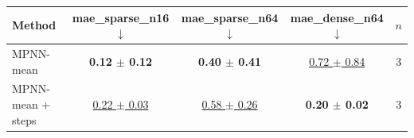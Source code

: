 \begin{tabular}{lcccc}
\toprule
Method & mae\_sparse\_n16 $\downarrow$ & mae\_sparse\_n64 $\downarrow$ & mae\_dense\_n64 $\downarrow$ & $n$ \\
\midrule
MPNN-mean & \textbf{0.12 $\pm$ 0.12} & \textbf{0.40 $\pm$ 0.41} & \underline{0.72 $\pm$ 0.84} & 3 \\
MPNN-mean + steps & \underline{0.22 $\pm$ 0.03} & \underline{0.58 $\pm$ 0.26} & \textbf{0.20 $\pm$ 0.02} & 3 \\
\bottomrule
\end{tabular}
